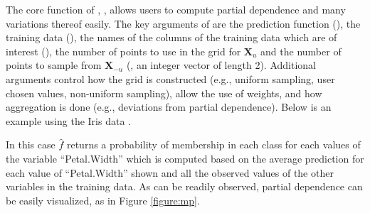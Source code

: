The core function of , , allows users to compute partial dependence and many variations thereof easily. The key arguments of  are the prediction function (), the training data (), the names of the columns of the training data which are of interest (), the number of points to use in the grid for $\mathbf{X}_u$ and the number of points to sample from $\mathbf{X}_{-u}$ (, an integer vector of length 2). Additional arguments control how the grid is constructed (e.g., uniform sampling, user chosen values, non-uniform sampling), allow the use of weights, and how aggregation is done (e.g., deviations from partial dependence). Below is an example using the Iris data \citep{anderson1936species}.


In this case $$ returns a probability of membership in each class for each values of the variable ``Petal.Width'' which is computed based on the average prediction for each value of ``Petal.Width'' shown and all the observed values of the other variables in the training data. As can be readily observed, partial dependence can be easily visualized, as in Figure \ref{figure:mp}.

